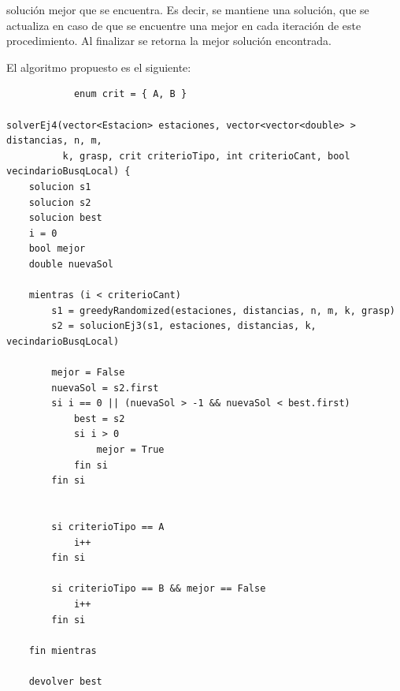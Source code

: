 solución mejor que se encuentra. Es decir, se mantiene una solución, que se actualiza en caso de que se encuentre una mejor en cada iteración de este procedimiento. Al finalizar se retorna la mejor solución encontrada.

        El algoritmo propuesto es el siguiente:

         \begin{codesnippet}
            \begin{verbatim}
			enum crit = { A, B }
			
solverEj4(vector<Estacion> estaciones, vector<vector<double> > distancias, n, m,
          k, grasp, crit criterioTipo, int criterioCant, bool vecindarioBusqLocal) {
    solucion s1
    solucion s2
    solucion best
    i = 0
    bool mejor
    double nuevaSol

    mientras (i < criterioCant)
        s1 = greedyRandomized(estaciones, distancias, n, m, k, grasp)
        s2 = solucionEj3(s1, estaciones, distancias, k, vecindarioBusqLocal)

        mejor = False
        nuevaSol = s2.first
        si i == 0 || (nuevaSol > -1 && nuevaSol < best.first) 
            best = s2
            si i > 0
                mejor = True
            fin si
        fin si
          

        si criterioTipo == A
            i++
        fin si

        si criterioTipo == B && mejor == False
            i++
        fin si
		
    fin mientras
    
    devolver best
            \end{verbatim}
            \end{codesnippet}


